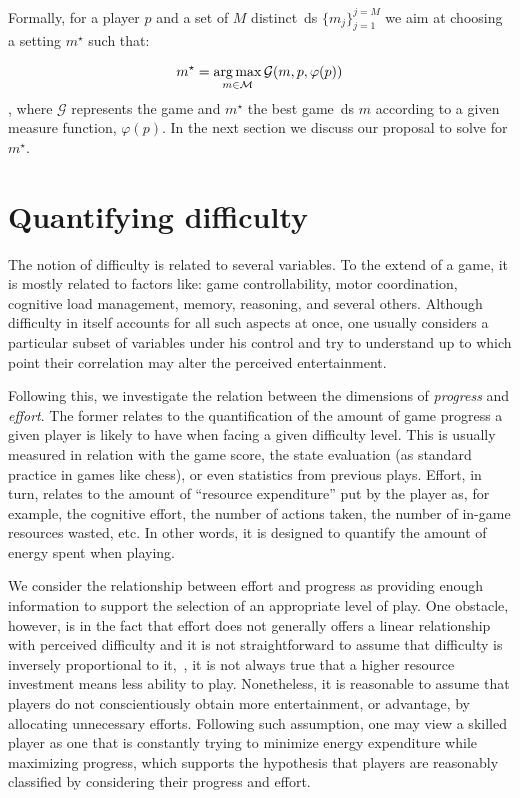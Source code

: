 Formally, for a player $p$ and a set of $M$ distinct~\gls{ds} $\{m_{j}\}^{j=M}_{j=1}$ we aim at choosing a setting $m^{\star}$ such that:

\begin{equation}
m^{\star} = \operatorname*{arg\,max}_{m \in \mathcal{M}} \mathcal{G}(m, p, \varphi(p))
\end{equation}
, where $\mathcal{G}$ represents the game and $m^{\star}$ the best game~\gls{ds} $m$ according to a given measure function, $\varphi(p)$. In the next section we discuss our proposal to solve for $m^{\star}$.

\section{Quantifying difficulty}\label{sec:quant_difficulty}
The notion of difficulty is related to several variables. To the extend of a game, it is mostly related to factors like: game controllability, motor coordination, cognitive load management, memory, reasoning, and several others. Although difficulty in itself accounts for all such aspects at once, one usually considers a particular subset of variables under his control and try to understand up to which point their correlation may alter the perceived entertainment.

Following this, we investigate the relation between the dimensions of \textit{progress} and \textit{effort}. The former relates to the quantification of the amount of game progress a given player is likely to have when facing a given difficulty level. This is usually measured in relation with the game score, the state evaluation (as standard practice in games like chess), or even statistics from previous plays. Effort, in turn, relates to the amount of ``resource expenditure'' put by the player as, for example, the cognitive effort, the number of actions taken, the number of in-game resources wasted, etc. In other words, it is designed to quantify the amount of energy spent when playing.

We consider the relationship between effort and progress as providing enough information to support the selection of an appropriate level of play. One obstacle, however, is in the fact that effort does not generally offers a linear relationship with perceived difficulty and it is not straightforward to assume that difficulty is inversely proportional to it,~\ie, it is not always true that a higher resource investment means less ability to play. 
Nonetheless, it is reasonable to assume that players do not conscientiously obtain more entertainment, or advantage, by allocating unnecessary efforts. Following such assumption, one may view a skilled player as one that is constantly trying to minimize energy expenditure while maximizing progress, which supports the hypothesis that players are reasonably classified by considering their progress and effort.


